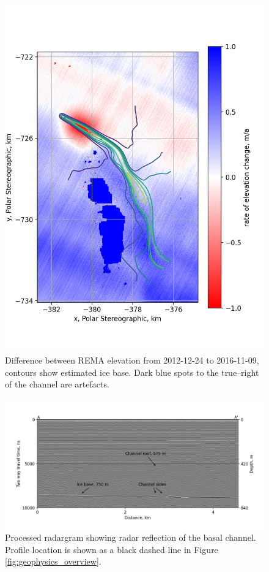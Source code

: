\begin{figure}[h!]
\includegraphics[width=1\textwidth]{chapters/2/REMAdiff_alone.png}
\caption[]{Difference between REMA elevation from 2012-12-24 to 2016-11-09, contours show estimated ice base. Dark blue spots to the true--right of the channel are artefacts.}
\label{fig:REMAdiff_alone.png}
\end{figure}


\begin{figure}[!ht]
\centering
\includegraphics[width=1.1\textwidth]{chapters/2/radargram.png}
\caption[Radargram]{Processed radargram showing radar reflection of the basal channel. Profile location is shown as a black dashed line in Figure \ref{fig:geophysics_overview}.}
\label{fig:radargram}
\end{figure}

